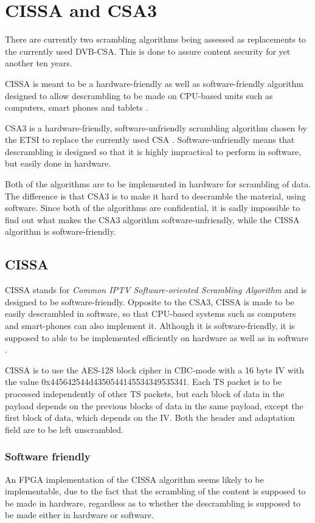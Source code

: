 \chapter{CISSA and CSA3}
There are currently two scrambling algorithms being assessed as 
replacements to the currently used DVB-CSA. This is done to assure 
content security for yet another ten years.

CISSA is meant to be a hardware-friendly as well as software-friendly 
algorithm designed to allow descrambling to be made on CPU-based units 
such as computers, smart phones and tablets \citep[p. 9]{DVB:2013}.

CSA3 is a hardware-friendly, software-unfriendly scrambling algorithm 
chosen by the ETSI to replace the currently used CSA 
\citep[pp. 6--7]{DVB:2013}. Software-unfriendly means that 
descrambling is designed so that it is highly impractical to perform 
in software, but easily done in hardware.

Both of the algorithms are to be implemented in hardware for 
scrambling of data. The difference is that CSA3 is to make it hard to 
descramble the material, using software. Since both of the algorithms 
are confidential, it is sadly impossible to find out what makes the 
CSA3 algorithm software-unfriendly, while the CISSA algorithm is 
software-friendly. 

\section{CISSA}
CISSA stands for \emph{Common IPTV Software-oriented Scrambling 
Algorithm} and is designed to be software-friendly. Opposite to the 
CSA3, CISSA is made to be easily descrambled in software, so that 
CPU-based systems such as computers and smart-phones can also 
implement it.  Although it is software-friendly, it is supposed to 
able to be implemented efficiently on hardware as well as in software 
\citep[p. 9]{DVB:2013}.

CISSA is to use the AES-128 block cipher in CBC-mode with a 16 byte 
IV with the value 0x445642544d4350544145534349535341. Each TS packet 
is to be processed independently of other TS packets, but each block 
of data in the payload depends on the previous blocks of data in the 
same payload, except the first block of data, which depends on the IV. 
Both the header and adaptation field are to be left unscrambled. \citep[p. 11]{DVB:2013}

\subsection{Software friendly}
An FPGA implementation of the CISSA algorithm seems likely to be 
implementable, due to the fact that the scrambling of the content is 
supposed to be made in hardware, regardless as to whether the 
descrambling is supposed to be made either in hardware or software.

